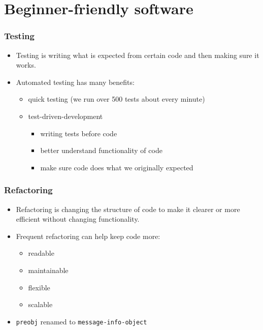 \documentclass{beamer}
\begin{document}
\section{Beginner-friendly software}

%

\begin{frame}[fragile]
\frametitle{Testing}

\begin{itemize}
\item Testing is writing what is expected from certain code and then making sure it works.
\item Automated testing has many benefits:
\begin{itemize}
\item quick testing (we run over 500 tests about every minute)
\item test-driven-development
\begin{itemize}
\item writing tests before code
\item better understand functionality of code
\item make sure code does what we originally expected
\end{itemize}
\end{itemize}
\end{itemize}	
\end{frame}

\begin{frame}[fragile]
\frametitle{Refactoring}
\begin{itemize}
\item Refactoring is changing the structure of code to make it clearer or more efficient  without changing functionality.
\item Frequent refactoring can help keep code more: 
\begin{itemize}
\item readable
\item maintainable
\item flexible
\item scalable
\end{itemize}
\item {\tt preobj} renamed to {\tt message-info-object}
\end{itemize}	
\end{frame}
\end{document}
